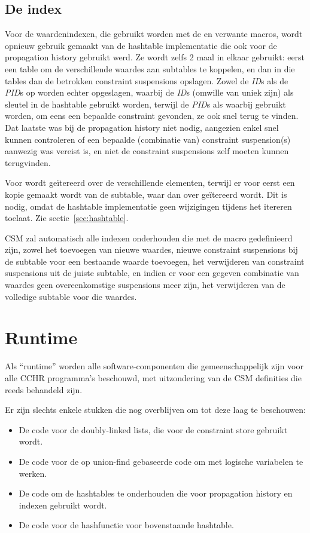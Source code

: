 \subsection{De index} \label{sec:index}

Voor de waardenindexen, die gebruikt worden met de  en verwante macros, wordt opnieuw gebruik gemaakt van de hashtable implementatie die ook voor de propagation history gebruikt werd. Ze wordt zelfs 2 maal in elkaar gebruikt: eerst een table om de verschillende waardes aan subtables te koppelen, en dan in die tables dan de betrokken constraint suspensions opslagen. Zowel de {\em ID}s als de {\em PID}s op worden echter opgeslagen, waarbij de {\em ID}s (omwille van uniek zijn) als sleutel in de hashtable gebruikt worden, terwijl de {\em PID}s als waarbij gebruikt worden, om eens een bepaalde constraint gevonden, ze ook snel terug te vinden. Dat laatste was bij de propagation history niet nodig, aangezien enkel snel kunnen controleren of een bepaalde (combinatie van) constraint suspension(s) aanwezig was vereist is, en niet de constraint suspensions zelf moeten kunnen terugvinden.

Voor  wordt ge\"itereerd over de verschillende elementen, terwijl er voor  eerst een kopie gemaakt wordt van de subtable, waar dan over ge\"itereerd wordt. Dit is nodig, omdat de hashtable implementatie geen wijzigingen tijdens het itereren toelaat. Zie sectie~\ref{sec:hashtable}.

CSM zal automatisch alle indexen onderhouden die met de macro  gedefinieerd zijn, zowel het toevoegen van nieuwe waardes, nieuwe constraint suspensions bij de subtable voor een bestaande waarde toevoegen, het verwijderen van constraint suspensions uit de juiste subtable, en indien er voor een gegeven combinatie van waardes geen overeenkomstige suspensions meer zijn, het verwijderen van de volledige subtable voor die waardes.

\section{Runtime} \label{sec:runtime}

Als ``runtime'' worden alle software-componenten die gemeenschappelijk zijn voor alle CCHR programma's beschouwd, met uitzondering van de CSM definities die reeds behandeld zijn.

Er zijn slechts enkele stukken die nog overblijven om tot deze laag te beschouwen: \begin{itemize}
  \item De code voor de doubly-linked lists, die voor de constraint store gebruikt wordt.
  \item De code voor de op union-find gebaseerde code om met logische variabelen te werken.
  \item De code om de hashtables te onderhouden die voor propagation history en indexen gebruikt wordt.
  \item De code voor de hashfunctie voor bovenstaande hashtable.
\end{itemize}

